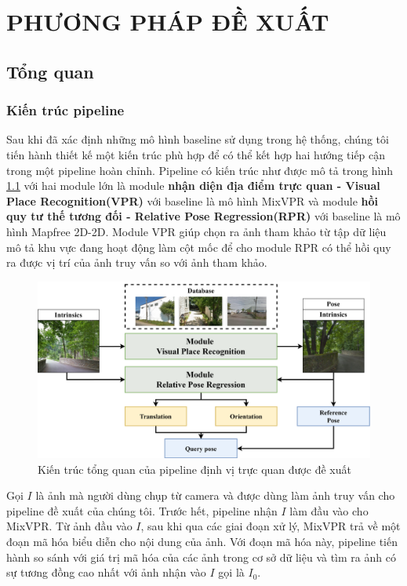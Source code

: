 \chapter{PHƯƠNG PHÁP ĐỀ XUẤT}

\section{Tổng quan}
\subsection{Kiến trúc pipeline}
Sau khi đã xác định những mô hình baseline sử dụng trong hệ thống, chúng tôi tiến hành thiết kế một kiến trúc phù hợp để có thể kết hợp hai hướng tiếp cận trong một pipeline hoàn chỉnh. Pipeline có kiến trúc như được mô tả trong hình \ref{fig:arch} với hai module lớn là module \textbf{nhận diện địa điểm trực quan - Visual Place Recognition(VPR)} với baseline là mô hình MixVPR và module \textbf{hồi quy tư thế tương đối - Relative Pose Regression(RPR)} với baseline là mô hình Mapfree 2D-2D. Module VPR giúp chọn ra ảnh tham khảo từ tập dữ liệu mô tả khu vực đang hoạt động làm cột mốc để cho module RPR có thể hồi quy ra được vị trí của ảnh truy vấn so với ảnh tham khảo.

\begin{figure}[htbp]
    \centering
    \includegraphics[width=\textwidth]{pics/Proposal/arch.png}
    \caption{Kiến trúc tổng quan của pipeline định vị trực quan được đề xuất}
    \label{fig:arch}
\end{figure}

Gọi $I$ là ảnh mà người dùng chụp từ camera và được dùng làm ảnh truy vấn cho pipeline đề xuất của chúng tôi. Trước hết, pipeline nhận $I$ làm đầu vào cho MixVPR. Từ ảnh đầu vào $I$, sau khi qua các giai đoạn xử lý, MixVPR trả về một đoạn mã hóa biểu diễn cho nội dung của ảnh. Với đoạn mã hóa này, pipeline tiến hành so sánh với giá trị mã hóa của các ảnh trong cơ sở dữ liệu và tìm ra ảnh có sự tương đồng cao nhất với ảnh nhận vào $I$ gọi là $I_0$.

